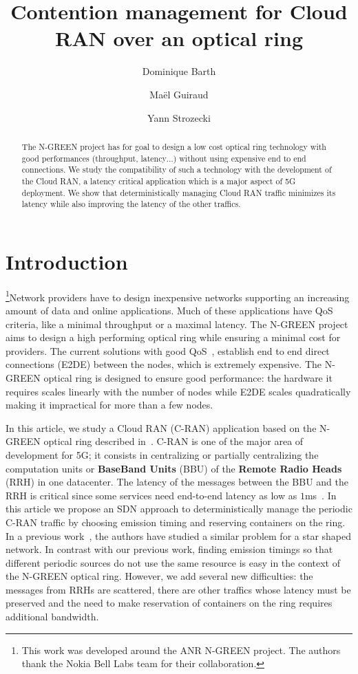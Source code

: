\documentclass[]{llncs}
\title{Contention management for Cloud RAN over an optical ring}
\author{Dominique Barth \inst{1}
  \and Ma\"el Guiraud \inst{1}
   \and Yann Strozecki \inst{1}
  }
\institute{David Laboratory, UVSQ}
\begin{document}
\maketitle


\begin{abstract}
The N-GREEN project has for goal to design a low cost optical ring technology with good performances (throughput, latency$\dots$) without using expensive end to end connections. We study the compatibility of such a technology with the development of the Cloud RAN, a latency critical application which is a major aspect of 5G deployment. We show that deterministically managing Cloud RAN traffic minimizes its latency while also improving the latency of the other traffics. 
\end{abstract}


\section{Introduction}

\footnote{This work was developed around the ANR N-GREEN project. The authors thank the Nokia Bell Labs team for their collaboration.}Network providers have to design inexpensive networks supporting an increasing amount of data and online applications. Much of these applications have QoS criteria, like a minimal throughput or a maximal latency. The N-GREEN project aims to design a high performing optical ring while ensuring a minimal cost for providers. The current solutions with good QoS~\cite{pizzinat2015things,tayq2017real}, establish end to end direct connections (E2DE) between the nodes, which is extremely expensive. The N-GREEN optical ring is designed to ensure good performance: the hardware it requires scales linearly with the number of nodes while E2DE scales quadratically making it impractical for more than a few nodes.

In this article, we study a Cloud RAN (C-RAN) application based on the N-GREEN optical ring described in~\cite{ngreenarchitecture,uscumlicscalable}. C-RAN is one of the major area of development for 5G; it consists in centralizing or partially centralizing the computation units or {\bf BaseBand Units} (BBU) of the {\bf Remote Radio Heads} (RRH) in one datacenter. The latency of the messages between the BBU and the RRH is critical since some services need end-to-end latency as low as $1$ms~\cite{3gpp5g,boccardi2014five}. In this article we propose an SDN approach to deterministically manage the periodic C-RAN traffic by choosing emission timing and reserving containers on the ring. In a previous work~\cite{dominique2018deterministic}, the authors have studied a similar problem for a star shaped network. In contrast with our previous work, finding emission timings so that different periodic sources do not use the same resource is easy in the context of the N-GREEN optical ring. However, we add several new difficulties: the messages from RRHs are scattered, there are other traffics whose latency must be preserved and the need to make reservation of containers on the ring requires additional bandwidth.
\end{document}
